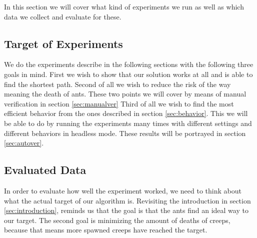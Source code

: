 In this section we will cover what kind of experiments we run as well as which data we collect and evaluate for these.

\subsection{Target of Experiments}
We do the experiments describe in the following sections with the following three goals in mind.
First we wish to show that our solution works at all and is able to find the shortest path. Second of all we wish to reduce the risk of the way meaning the death of ants. These two points we will cover by means of manual verification in section \ref{sec:manualver}
Third of all we wish to find the most efficient behavior from the ones described in section \ref{sec:behavior}. This we will be able to do by running the experiments many times with different settings and different behaviors in headless mode. These results will be portrayed in section \ref{sec:autover}.

\subsection{Evaluated Data}
\label{sec:experimentevdata}

In order to evaluate how well the experiment worked, we need to think about what the actual target of our algorithm is. Revisiting the introduction in section \ref{sec:introduction}, reminds us that the goal is that the ants find an ideal way to our target. The second goal is minimizing the amount of deaths of creeps, because that means more spawned creeps have reached the target.


